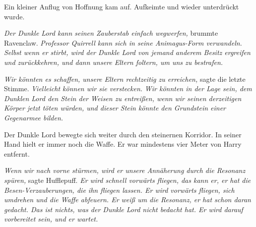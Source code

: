 Ein kleiner Anflug von Hoffnung kam auf. Aufkeimte und wieder unterdrückt wurde.

\emph{Der Dunkle Lord kann seinen Zauberstab einfach wegwerfen,} brummte Ravenclaw.
\emph{Professor Quirrell kann sich in seine Animagus-Form verwandeln. Selbst wenn er stirbt, wird der Dunkle Lord von jemand anderem Besitz ergreifen und zurückkehren, und dann unsere Eltern foltern, um uns zu bestrafen.}

\emph{Wir könnten es schaffen, unsere Eltern rechtzeitig zu erreichen,} sagte die letzte Stimme. \emph{Vielleicht können wir sie verstecken.} \emph{Wir könnten in der Lage sein, dem Dunklen Lord den Stein der Weisen zu entreißen, wenn wir seinen derzeitigen Körper jetzt töten würden, und dieser Stein könnte den Grundstein einer Gegenarmee bilden.}

Der Dunkle Lord bewegte sich weiter durch den steinernen Korridor. In seiner Hand hielt er immer noch die Waffe. Er war mindestens vier Meter von Harry entfernt.

\emph{Wenn wir nach vorne stürmen, wird er unsere Annäherung durch die Resonanz spüren,} sagte Hufflepuff. \emph{Er wird schnell vorwärts fliegen, das kann er, er hat die Besen-Verzauberungen, die ihn fliegen lassen. Er wird vorwärts fliegen, sich umdrehen und die Waffe abfeuern. Er weiß um die Resonanz, er hat schon daran gedacht. Das ist nichts, was der Dunkle Lord nicht bedacht hat. Er wird darauf vorbereitet sein, und er wartet.}

